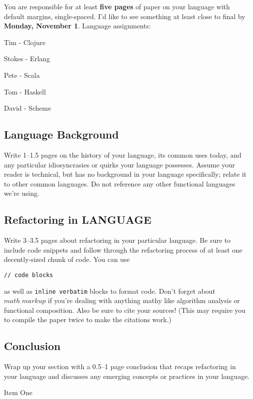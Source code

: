 \documentclass{article}
\begin{document}

You are responsible for at least \textbf{five pages} of paper on your language with default margins, single-spaced. I'd like to see something at least close to final by \textbf{Monday, November 1}. Language assignments:

\begin{itemize*}
\item Tim - Clojure
\item Stokes - Erlang
\item Pete - Scala
\item Tom - Haskell
\item David - Scheme
\end{itemize*}

\subsection*{Language Background}

Write 1--1.5 pages on the history of your language, its common uses today, and any particular idiosyncrasies or quirks your language possesses. Assume your reader is technical, but has no background in your language specifically; relate it to other common languages. Do not reference any other functional languages we're using.

\subsection*{Refactoring in LANGUAGE}

Write 3--3.5 pages about refactoring in your particular language. Be sure to include code snippets and follow through the refactoring process of at least one decently-sized chunk of code. You can use

\begin{verbatim}
// code blocks
\end{verbatim}

as well as \verb!inline verbatim! blocks to format code. Don't forget about $math \; markup$ if you're dealing with anything mathy like algorithm analysis or functional composition. Also be sure to cite your sources! (This may require you to compile the paper twice to make the citations work\cite{Item1}.)

\subsection*{Conclusion}

Wrap up your section with a 0.5--1 page conclusion that recaps refactoring in your language and discusses any emerging concepts or practices in your language.

\begin{thebibliography}{9}
 Item One
\end{thebibliography}
\end{document}
